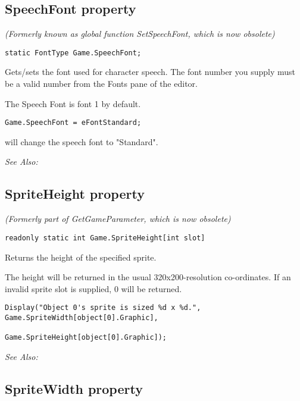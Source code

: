 \subsection{SpeechFont property}\label{Game.SpeechFont}%

\it{(Formerly known as global function SetSpeechFont, which is now obsolete)}

\begin{verbatim}
static FontType Game.SpeechFont;
\end{verbatim}
Gets/sets the font used for character speech. The font number you
supply must be a valid number from the Fonts pane of the editor.

The Speech Font is font 1 by default.

\begin{verbatim}
Game.SpeechFont = eFontStandard;
\end{verbatim}
will change the speech font to "Standard".

\it{See Also:} 


\subsection{SpriteHeight property}\label{Game.SpriteHeight}%

\it{(Formerly part of GetGameParameter, which is now obsolete)}

\begin{verbatim}
readonly static int Game.SpriteHeight[int slot]
\end{verbatim}
Returns the height of the specified sprite.

The height will be returned in the usual 320x200-resolution co-ordinates. If an invalid
sprite slot is supplied, 0 will be returned.

\begin{verbatim}
Display("Object 0's sprite is sized %d x %d.", Game.SpriteWidth[object[0].Graphic],
                                               Game.SpriteHeight[object[0].Graphic]);
\end{verbatim}

\it{See Also:} 


\subsection{SpriteWidth property}\label{Game.SpriteWidth}%

